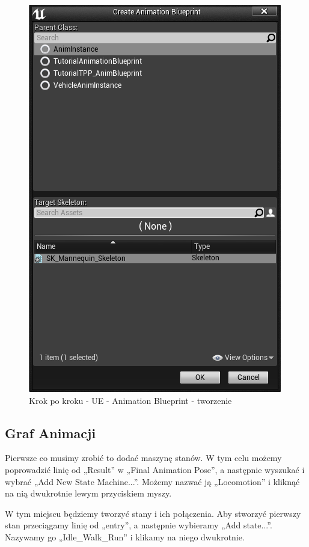 \documentclass[12pt]{xmgr}
\begin{document}
\begin{figure}[!htb]
    \begin{center}
    \includegraphics[scale=0.75]{Screeny/UeKrokPoKroku/UE-AnimBPcreate.png}
    \end{center}
    \caption{Krok po kroku - UE - Animation Blueprint - tworzenie}
\end{figure}

\newpage
\subsection{Graf Animacji}
Pierwsze co musimy zrobić to dodać maszynę stanów. W tym celu możemy poprowadzić linię od „Result” w „Final Animation Pose”, a następnie wyszukać i wybrać „Add New State Machine...”. Możemy nazwać ją „Locomotion” i kliknąć na nią dwukrotnie lewym przyciskiem myszy.

W tym miejscu będziemy tworzyć stany i ich połączenia. Aby stworzyć pierwszy stan przeciągamy linię od „entry”, a następnie wybieramy „Add state...”. Nazywamy go „Idle\_Walk\_Run” i klikamy na niego dwukrotnie.
\end{document}
